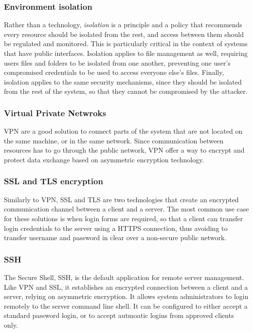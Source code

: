 \subsubsection{Environment isolation}
Rather than a technology, \emph{isolation} is a principle and a policy that
recommends every resource should be isolated from the rest, and access between
them should be regulated and monitored. This is particularly critical in the
context of systems that have public interfaces. Isolation applies to file
management as well, requiring users files and folders to be isolated from one
another, preventing one user's compromised credentials to be used to access
everyone else's files. Finally, isolation applies to the same security
mechanisms, since they should be isolated from the rest of the system, so that
they cannot be compromised by the attacker.

\subsubsection{Virtual Private Netwroks}
VPN are a good solution to connect parts of the system that are not located on
the same machine, or in the same network. Since communication between resources
has to go through the public network, VPN offer a way to encrypt and protect
data exchange based on asymmetric encryption technology.

\subsubsection{SSL and TLS encryption}
Similarly to VPN, SSL and TLS are two technologies that create an encrypted
communication channel between a client and a server. The most common use case
for these solutions is when login forms are required, so that a client can
transfer login credentials to the server using a HTTPS connection, thus avoiding
to transfer username and password in clear over a non-secure public network.

\subsubsection{SSH}
The Secure Shell, SSH, is the default application for remote server management.
Like VPN and SSL, it establishes an encrypted connection between a client and a
server, relying on asymmetric encryption. It allows system administrators to
login remotely to the server command line shell. It can be configured to either
accept a standard password login, or to accept autmoatic logins from approved
clients only.

